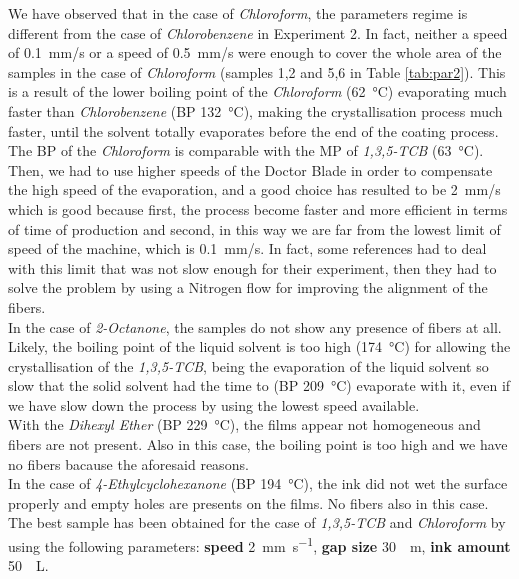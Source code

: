 \documentclass  [
  paper    = a4,
  BCOR     = 10mm,
  twoside,
  fontsize = 12pt,
  fleqn,
  toc      = bibnumbered,
  toc      = listofnumbered,
  numbers  = noendperiod,
  headings = normal,
  listof   = leveldown,
  version  = 3.03
]                                       {scrreprt}
\begin{document}
We have observed that in the case of \emph{Chloroform}, the parameters regime is different from the case of \emph{Chlorobenzene} in Experiment 2. In fact, neither a speed of \SI{0.1}{\milli\metre/\second} or a speed of \SI{0.5}{\milli\metre/\second} were enough to cover the whole area of the samples in the case of \emph{Chloroform} (samples 1,2 and 5,6 in Table \ref{tab:par2}). This is a result of the lower boiling point of the \emph{Chloroform} (\SI{62}{\celsius}) evaporating much faster than \emph{Chlorobenzene} (BP \SI{132}{\celsius}), making the crystallisation process much faster, until the solvent totally evaporates before the end of the coating process. The BP of the \emph{Chloroform} is comparable with the MP of \emph{1,3,5-TCB} (\SI{63}{\celsius}). Then, we had to use higher speeds of the Doctor Blade in order to compensate the high speed of the evaporation, and a good choice has resulted to be \SI{2}{\milli\metre/\second} which is good because first, the process become faster and more efficient in terms of time of production and second, in this way we are far from the lowest limit of speed of the machine, which is \SI{0.1}{\milli\metre/\second}. In fact, some references had to deal with this limit that was not slow enough for their experiment, then they had to solve the problem by using a Nitrogen flow for improving the alignment of the fibers.\\
In the case of \emph{2-Octanone}, the samples do not show any presence of fibers at all. Likely, the boiling point of the liquid solvent is too high (\SI{174}{\celsius}) for allowing the crystallisation of the \emph{1,3,5-TCB}, being the evaporation of the liquid solvent so slow that the solid solvent had the time to (BP \SI{209}{\celsius}) evaporate with it, even if we have slow down the process by using the lowest speed available.\\
With the \emph{Dihexyl Ether} (BP \SI{229}{\celsius}), the films appear not homogeneous and fibers are not present. Also in this case, the boiling point is too high and we have no fibers bacause the aforesaid reasons.\\
In the case of \emph{4-Ethylcyclohexanone} (BP \SI{194}{\celsius}), the ink did not wet the surface properly and empty holes are presents on the films. No fibers also in this case.\\
The best sample has been obtained for the case of \emph{1,3,5-TCB} and \emph{Chloroform} by using the following parameters: \textbf{speed} \SI[per-mode=symbol]{2}{\milli\meter\per\second}, \textbf{gap size} \SI{30}{\mu \meter}, \textbf{ink amount} \SI{50}{\mu \liter}.
\end{document}
